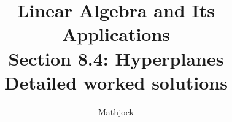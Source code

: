 
\title{\textbf{Linear Algebra and Its Applications}\\[0.3em]Section 8.4: Hyperplanes\\[0.3em]\large Detailed worked solutions}
\author{Mathjock}
\date{}

\maketitle
\bookinfo
\tableofcontents
\clearpage
\renewcommand{\thesection}{8.\arabic{section}}
\renewcommand{\theHsection}{8.\arabic{section}}
\setcounter{section}{3}


